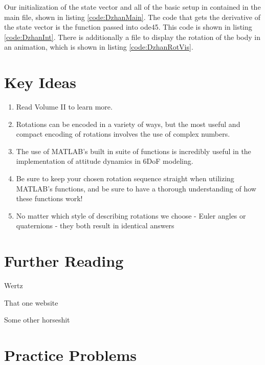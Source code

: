 \documentclass[12pt]{report}
\begin{document}
Our initialization of the \gls{state vector} and all of the basic setup in contained in the main file, shown in listing \ref{code:DzhanMain}. The code that gets the derivative of the \gls{state vector} is the function passed into ode45. This code is shown in listing \ref{code:DzhanInt}. There is additionally a file to display the rotation of the body in an animation, which is shown in listing \ref{code:DzhanRotVis}.

\section{Key Ideas}
\begin{enumerate}
    \item Read Volume II to learn more.
    \item Rotations can be encoded in a variety of ways, but the most useful and compact encoding of rotations involves the use of complex numbers.
    \item The use of MATLAB's built in suite of functions is incredibly useful in the implementation of attitude dynamics in 6DoF modeling.
    \item Be sure to keep your chosen rotation sequence straight when utilizing MATLAB's functions, and be sure to have a thorough understanding of how these functions work!
    \item No matter which style of describing rotations we choose - Euler angles or quaternions - they both result in identical answers
\end{enumerate}
\section{Further Reading}

Wertz

That one website

Some other horseshit

\section{Practice Problems}
\end{document}
